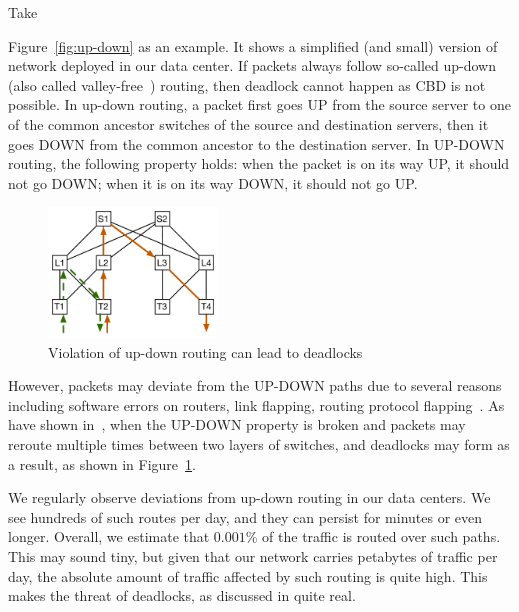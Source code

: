 Take {Figure~\ref{fig:up-down} as an example. It shows a simplified (and small) version of
network deployed in our data center. If packets always follow so-called
up-down (also called valley-free~\cite{qiu2007toward}) routing, then deadlock
cannot happen as CBD is not possible. In up-down routing, a packet first goes UP
from the source server to one of the common ancestor switches of the source and
destination servers, then it goes DOWN from the common ancestor to the
destination server.  In UP-DOWN routing, the following property holds: when the
packet is on its way UP, it should not go DOWN; when it is on its way DOWN, it
should not go UP.

\begin{figure}
	\centering
	\includegraphics[width=0.4\textwidth] {figs/up-down}
	\caption{Violation of up-down routing can lead to deadlocks}
	\label{fig:up-down-deadlock}
\end{figure}

However, packets may deviate from the UP-DOWN paths due to several reasons
including software errors on routers, link flapping, routing protocol
flapping~\cite{f10}. As have shown in~\cite{shpiner2016unlocking}, when the
UP-DOWN property is broken and packets may reroute multiple times between two
layers of switches, and deadlocks may form as a result, as shown in
Figure~\ref{fig:up-down-deadlock}.

We regularly observe deviations from up-down routing in our data centers.  We
see hundreds of such routes per day, and they can persist for minutes or even
longer. Overall, we estimate that $0.001\%$ of the traffic is routed over such
paths. This may sound tiny, but given that our network carries petabytes of
traffic per day, the absolute amount of traffic affected by such routing is
quite high. This makes the threat of deadlocks, as discussed
in\cite{rdmaatscale,shpiner2016unlocking,hu2016deadlocks} quite real.

}
